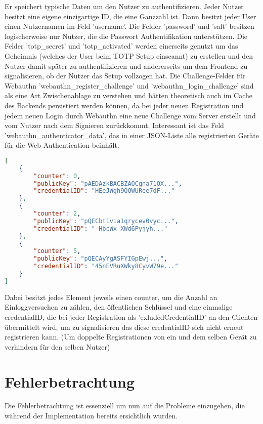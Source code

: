 \begin{enumerate}
Er speichert typische Daten um den Nutzer zu authentifizieren. Jeder Nutzer besitzt eine eigene einzigartige ID, die eine Ganzzahl ist. Dann besitzt jeder User einen Nutzernamen im Feld 'username'. Die Felder 'password' und 'salt' besitzen logischerweise nur Nutzer, die die Passwort Authentifikation unterstützen. Die Felder 'totp\_secret' und 'totp\_activated' werden einerseits genutzt um das Geheimnis (welches der User beim TOTP Setup einscannt) zu erstellen und den Nutzer damit später zu authentifizieren und andererseits um dem Frontend zu signalisieren, ob der Nutzer das Setup vollzogen hat. Die Challenge-Felder für Webauthn 'webauthn\_register\_challenge' und 'webauthn\_login\_challenge' sind als eine Art Zwischenablage zu verstehen und hätten theoretisch auch im Cache des Backends persistiert werden können, da bei jeder neuen Registration und jedem neuen Login durch Webauthn eine neue Challenge vom Server erstellt und vom Nutzer nach dem Signieren zurückkommt. Interessant ist das Feld 'webauthn\_authenticator\_data', das in einer JSON-Liste alle registrierten Geräte für die Web Authentication beinhält.
\newpage

 \begin{lstlisting}[language=json,firstnumber=1]
[
    {
        "counter": 0,
        "publicKey": "pAEDAzkBACBZAQCgna71QX...",
        "credentialID": "HEeJWgh9QOWURee7dF..."
    },
    {
        "counter": 2,
        "publicKey": "pQECbt1via1qrycev0vyc...",
        "credentialID": "_HbcWx_XWd6Pyjyh..."
    },
    {
        "counter": 5,
        "publicKey": "pQECAyYgASFYIGpEwj...",
        "credentialID": "45nEVRuXWky8CyvW79e..."
    }
]
\end{lstlisting}

Dabei besitzt jedes Element jeweils einen counter, um die Anzahl an Einloggversuchen zu zählen, den öffentlichen Schlüssel und eine einmalige credentialID, die bei jeder Registration als 'exludedCredentialID' an den Clienten übermittelt wird, um zu signalisieren das diese credentialID sich nicht erneut registrieren kann. (Um doppelte Registrationen von ein und dem selben Gerät zu verhindern für den selben Nutzer)
\end{enumerate}

\section{Fehlerbetrachtung}

Die Fehlerbetrachtung ist essenziell um nun auf die Probleme einzugehen, die während der Implementation bereits ersichtlich wurden.

